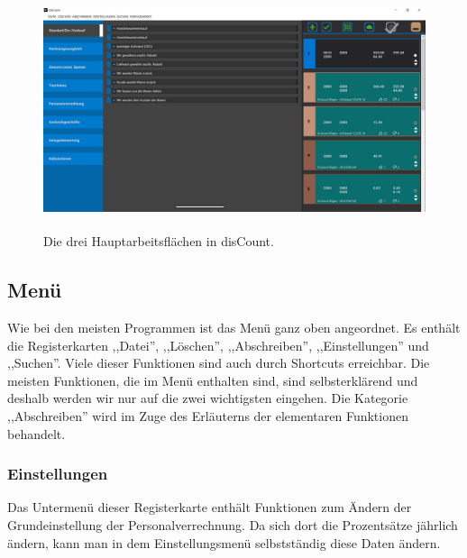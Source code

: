 \documentclass[12pt]{report}
\begin{document}
\begin{figure}[H]
	\centering
	\includegraphics[height=7cm]{images/hauptarbeitsflaechen}
	\caption[Hauptarbeitsflächen]{Die drei Hauptarbeitsflächen in disCount.}
\end{figure}


\subsection{Menü}
Wie bei den meisten Programmen ist das Menü ganz oben angeordnet. Es enthält die Registerkarten ,,Datei'', ,,Löschen'', ,,Abschreiben'', ,,Einstellungen'' und ,,Suchen''. Viele dieser Funktionen sind auch durch Shortcuts erreichbar. Die meisten Funktionen, die im Menü enthalten sind, sind selbsterklärend und deshalb werden wir nur auf die zwei wichtigsten eingehen. Die Kategorie ,,Abschreiben'' wird im Zuge des Erläuterns der elementaren Funktionen behandelt.

\subsubsection{Einstellungen}
Das Untermenü dieser Registerkarte enthält Funktionen zum Ändern der Grundeinstellung der Personalverrechnung. Da sich dort die Prozentsätze jährlich ändern, kann man in dem Einstellungsmenü selbstständig diese Daten ändern.
\end{document}
